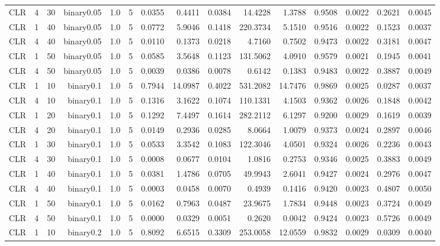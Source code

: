\begin{longtable}{rrrrrrrrrrrrrrr}
  CLR & 4 & 30 & binary0.05 & 1.0 & 5 & 0.0355 & 0.4411 & 0.0384 & 14.4228 & 1.3788 & 0.9508 & 0.0022 & 0.2621 & 0.0045 \\ 
  CLR & 1 & 40 & binary0.05 & 1.0 & 5 & 0.0772 & 5.9046 & 0.1418 & 220.3734 & 5.1510 & 0.9516 & 0.0022 & 0.1523 & 0.0037 \\ 
  CLR & 4 & 40 & binary0.05 & 1.0 & 5 & 0.0110 & 0.1373 & 0.0218 & 4.7160 & 0.7502 & 0.9473 & 0.0022 & 0.3181 & 0.0047 \\ 
  CLR & 1 & 50 & binary0.05 & 1.0 & 5 & 0.0585 & 3.5648 & 0.1123 & 131.5062 & 4.0910 & 0.9579 & 0.0021 & 0.1945 & 0.0041 \\ 
  CLR & 4 & 50 & binary0.05 & 1.0 & 5 & 0.0039 & 0.0386 & 0.0078 & 0.6142 & 0.1383 & 0.9483 & 0.0022 & 0.3887 & 0.0049 \\ 
  CLR & 1 & 10 & binary0.1 & 1.0 & 5 & 0.7944 & 14.0987 & 0.4022 & 531.2082 & 14.7476 & 0.9869 & 0.0025 & 0.0287 & 0.0037 \\ 
  CLR & 4 & 10 & binary0.1 & 1.0 & 5 & 0.1316 & 3.1622 & 0.1074 & 110.1331 & 4.1503 & 0.9362 & 0.0026 & 0.1848 & 0.0042 \\ 
  CLR & 1 & 20 & binary0.1 & 1.0 & 5 & 0.1292 & 7.4497 & 0.1614 & 282.2112 & 6.1297 & 0.9200 & 0.0029 & 0.1619 & 0.0039 \\ 
  CLR & 4 & 20 & binary0.1 & 1.0 & 5 & 0.0149 & 0.2936 & 0.0285 & 8.0664 & 1.0079 & 0.9373 & 0.0024 & 0.2897 & 0.0046 \\ 
  CLR & 1 & 30 & binary0.1 & 1.0 & 5 & 0.0533 & 3.3542 & 0.1083 & 122.3046 & 4.0501 & 0.9324 & 0.0026 & 0.2236 & 0.0043 \\ 
  CLR & 4 & 30 & binary0.1 & 1.0 & 5 & 0.0008 & 0.0677 & 0.0104 & 1.0816 & 0.2753 & 0.9346 & 0.0025 & 0.3883 & 0.0049 \\ 
  CLR & 1 & 40 & binary0.1 & 1.0 & 5 & 0.0381 & 1.4786 & 0.0705 & 49.9943 & 2.6041 & 0.9427 & 0.0024 & 0.2976 & 0.0047 \\ 
  CLR & 4 & 40 & binary0.1 & 1.0 & 5 & 0.0003 & 0.0458 & 0.0070 & 0.4939 & 0.1416 & 0.9420 & 0.0023 & 0.4807 & 0.0050 \\ 
  CLR & 1 & 50 & binary0.1 & 1.0 & 5 & 0.0162 & 0.7963 & 0.0487 & 23.9675 & 1.7834 & 0.9448 & 0.0023 & 0.3724 & 0.0049 \\ 
  CLR & 4 & 50 & binary0.1 & 1.0 & 5 & 0.0000 & 0.0329 & 0.0051 & 0.2620 & 0.0042 & 0.9424 & 0.0023 & 0.5726 & 0.0049 \\ 
  CLR & 1 & 10 & binary0.2 & 1.0 & 5 & 0.8092 & 6.6515 & 0.3309 & 253.0058 & 12.0559 & 0.9832 & 0.0029 & 0.0309 & 0.0040 \\ 

\end{longtable}
